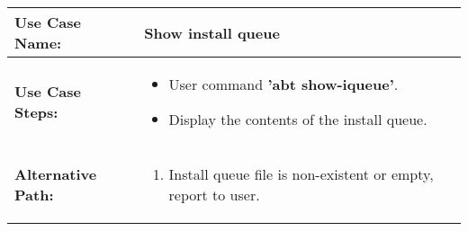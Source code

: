 \medskip

\begin{tabularx}{\linewidth}{|l|X|}
\hline
\textbf{Use Case Name:} & \textbf{Show install queue} \\
\hline
\textbf{Use Case Steps:} & 
\begin{minipage}{\linewidth} 
  \vspace{0.05em}
  \begin{itemize}
    \item User command \textbf{'abt show-iqueue'}.
    \item Display the contents of the install queue.
  \end{itemize}
  \vspace{0.05em}
\end{minipage}
\\
\hline 
\textbf{Alternative Path:} &
\begin{minipage}{\linewidth}
  \vspace{0.05em} 
  \begin{enumerate}
    \item Install queue file is non-existent or empty, report to user.
  \end{enumerate}
  \vspace{0.05em} 
\end{minipage}
\\
\hline
\end{tabularx}

\newpage

